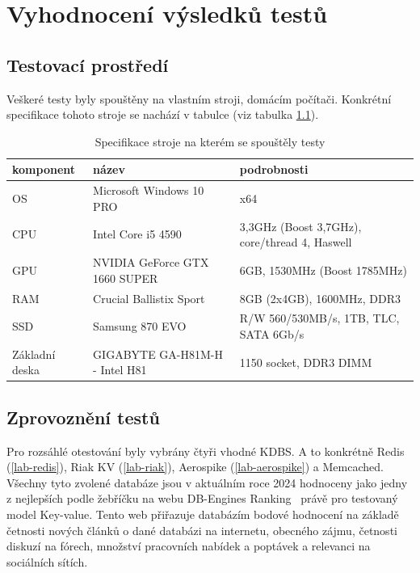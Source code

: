 \documentclass[czech,master,dept460,male,csharp,cpdeclaration]{diploma}
\begin{document}
	\chapter{Vyhodnocení výsledků testů\label{chapter:4-test_results}}
	
	\section{Testovací prostředí}
	
	Veškeré testy byly spouštěny na vlastním stroji, domácím počítači. Konkrétní specifikace tohoto stroje se nachází v tabulce  (viz tabulka \ref{tab_my_pc_spec}). 
	
	\begin{table}
	\centering
	\caption{Specifikace stroje na kterém se spouštěly testy\label{tab_my_pc_spec}}
		\begin{tabular}{ l | l | l } 
			\toprule
			komponent & název & podrobnosti \\
			\midrule
			OS & Microsoft Windows 10 PRO & x64 \\
			CPU & Intel Core i5 4590 & 3,3GHz (Boost 3,7GHz), core/thread 4, Haswell\\
			GPU & NVIDIA GeForce GTX 1660 SUPER & 6GB, 1530MHz (Boost 1785MHz) \\
			RAM & Crucial Ballistix Sport & 8GB (2x4GB), 1600MHz, DDR3 \\
			SSD & Samsung 870 EVO & R/W 560/530MB/s, 1TB, TLC, SATA 6Gb/s \\
			Základní deska & GIGABYTE GA-H81M-H - Intel H81 & 1150 socket, DDR3 DIMM \\
			\bottomrule
		\end{tabular}
	\end{table}

	\section{Zprovoznění testů}
	
	Pro rozsáhlé otestování byly vybrány čtyři vhodné KDBS. A to konkrétně Redis (\ref{lab-redis}), Riak KV (\ref{lab-riak}), Aerospike (\ref{lab-aerospike}) a Memcached. Všechny tyto zvolené databáze jsou v aktuálním roce 2024 hodnoceny jako jedny z nejlepších podle žebříčku na webu DB-Engines Ranking~\cite{db-engineers-ranking} právě pro testovaný model Key-value. Tento web přiřazuje databázím bodové hodnocení na základě četnosti nových článků o dané databázi na internetu, obecného zájmu, četnosti diskuzí na fórech, množství pracovních nabídek a poptávek a relevanci na sociálních sítích.
	
\end{document}
